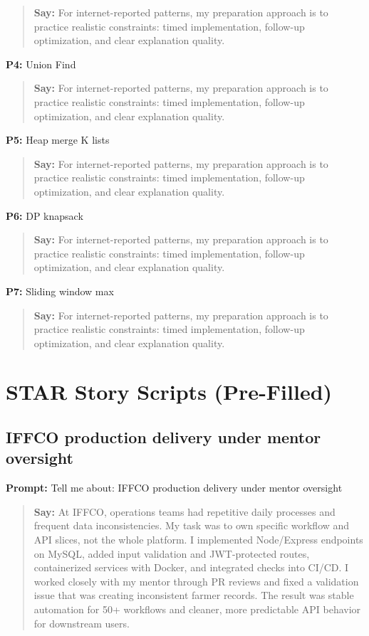 \documentclass[9pt,a4paper]{article}
\begin{document}
\begin{quote}\small\textbf{Say:} For internet-reported patterns, my preparation approach is to practice realistic constraints: timed implementation, follow-up optimization, and clear explanation quality.\end{quote}
\vspace{2mm}
\textbf{P4:} Union Find

\begin{quote}\small\textbf{Say:} For internet-reported patterns, my preparation approach is to practice realistic constraints: timed implementation, follow-up optimization, and clear explanation quality.\end{quote}
\vspace{2mm}
\textbf{P5:} Heap merge K lists

\begin{quote}\small\textbf{Say:} For internet-reported patterns, my preparation approach is to practice realistic constraints: timed implementation, follow-up optimization, and clear explanation quality.\end{quote}
\vspace{2mm}
\textbf{P6:} DP knapsack

\begin{quote}\small\textbf{Say:} For internet-reported patterns, my preparation approach is to practice realistic constraints: timed implementation, follow-up optimization, and clear explanation quality.\end{quote}
\vspace{2mm}
\textbf{P7:} Sliding window max

\begin{quote}\small\textbf{Say:} For internet-reported patterns, my preparation approach is to practice realistic constraints: timed implementation, follow-up optimization, and clear explanation quality.\end{quote}
\vspace{2mm}
\newpage\section{STAR Story Scripts (Pre-Filled)}
\subsection{IFFCO production delivery under mentor oversight}
\textbf{Prompt:} Tell me about: IFFCO production delivery under mentor oversight

\begin{quote}\small\textbf{Say:} At IFFCO, operations teams had repetitive daily processes and frequent data inconsistencies. My task was to own specific workflow and API slices, not the whole platform. I implemented Node/Express endpoints on MySQL, added input validation and JWT-protected routes, containerized services with Docker, and integrated checks into CI/CD. I worked closely with my mentor through PR reviews and fixed a validation issue that was creating inconsistent farmer records. The result was stable automation for 50+ workflows and cleaner, more predictable API behavior for downstream users.\end{quote}
\vspace{2mm}
\end{document}
